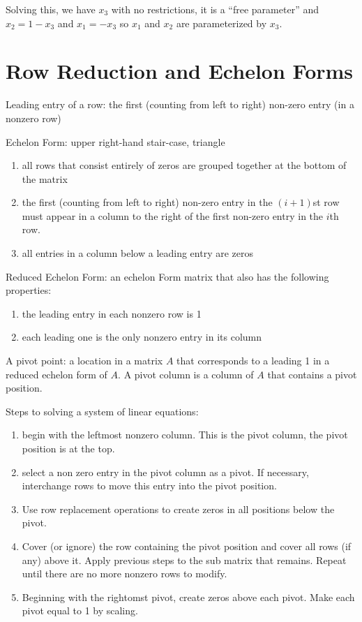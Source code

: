 \documentclass[../linalg.tex]{subfiles}
\begin{document}
Solving this, we have $x_3$ with no restrictions, it is a ``free parameter'' and $x_2=1-x_3$ and $x_1=-x_3$ so $x_1$ and $x_2$ are parameterized by $x_3$.

\section{Row Reduction and Echelon Forms}
Leading entry of a row: the first (counting from left to right) non-zero entry (in a nonzero row)

Echelon Form: upper right-hand stair-case, triangle 
\begin{enumerate}
    \item all rows that consist entirely of zeros are grouped together at the bottom of the matrix 
    \item the first (counting from left to right) non-zero entry in the $(i+1)$st row must appear in a column to the right of the first non-zero entry in the $i$th row.
    \item all entries in a column below a leading entry are zeros 
\end{enumerate}

Reduced Echelon Form: an echelon Form matrix that also has the following properties:
\begin{enumerate}
    \item the leading entry in each nonzero row is 1 
    \item each leading one is the only nonzero entry in its column
\end{enumerate}

A pivot point: a location in a matrix $A$ that corresponds to a leading 1 in a reduced echelon form of $A$. A pivot column is a column of $A$ that contains a pivot position.

Steps to solving a system of linear equations:
\begin{enumerate}
    \item begin with the leftmost nonzero column. This is the pivot column, the pivot position is at the top.
    \item select a non zero entry in the pivot column as a pivot. If necessary, interchange rows to move this entry into the pivot position.
    \item Use row replacement operations to create zeros in all positions below the pivot.
    \item Cover (or ignore) the row containing the pivot position and cover all rows (if any) above it. Apply previous steps to the sub matrix that remains. Repeat until there are no more nonzero rows to modify.
    \item Beginning with the rightomst pivot, create zeros above each pivot. Make each pivot equal to 1 by scaling.
\end{enumerate}
\end{document}

